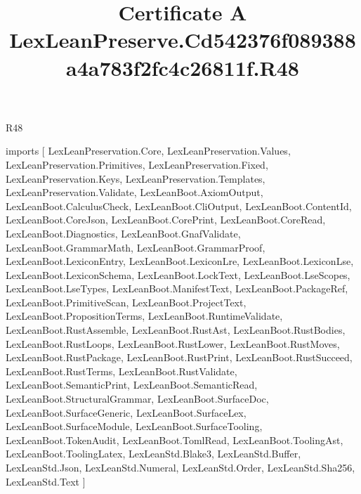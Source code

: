 \begin{lexlean}{R48}
\title{Certificate A LexLeanPreserve.Cd542376f089388a4a783f2fc4c26811f.R48}
\begin{coremodule}
imports [
  LexLeanPreservation.Core,
  LexLeanPreservation.Values,
  LexLeanPreservation.Primitives,
  LexLeanPreservation.Fixed,
  LexLeanPreservation.Keys,
  LexLeanPreservation.Templates,
  LexLeanPreservation.Validate,
  LexLeanBoot.AxiomOutput,
  LexLeanBoot.CalculusCheck,
  LexLeanBoot.CliOutput,
  LexLeanBoot.ContentId,
  LexLeanBoot.CoreJson,
  LexLeanBoot.CorePrint,
  LexLeanBoot.CoreRead,
  LexLeanBoot.Diagnostics,
  LexLeanBoot.GnafValidate,
  LexLeanBoot.GrammarMath,
  LexLeanBoot.GrammarProof,
  LexLeanBoot.LexiconEntry,
  LexLeanBoot.LexiconLre,
  LexLeanBoot.LexiconLse,
  LexLeanBoot.LexiconSchema,
  LexLeanBoot.LockText,
  LexLeanBoot.LseScopes,
  LexLeanBoot.LseTypes,
  LexLeanBoot.ManifestText,
  LexLeanBoot.PackageRef,
  LexLeanBoot.PrimitiveScan,
  LexLeanBoot.ProjectText,
  LexLeanBoot.PropositionTerms,
  LexLeanBoot.RuntimeValidate,
  LexLeanBoot.RustAssemble,
  LexLeanBoot.RustAst,
  LexLeanBoot.RustBodies,
  LexLeanBoot.RustLoops,
  LexLeanBoot.RustLower,
  LexLeanBoot.RustMoves,
  LexLeanBoot.RustPackage,
  LexLeanBoot.RustPrint,
  LexLeanBoot.RustSucceed,
  LexLeanBoot.RustTerms,
  LexLeanBoot.RustValidate,
  LexLeanBoot.SemanticPrint,
  LexLeanBoot.SemanticRead,
  LexLeanBoot.StructuralGrammar,
  LexLeanBoot.SurfaceDoc,
  LexLeanBoot.SurfaceGeneric,
  LexLeanBoot.SurfaceLex,
  LexLeanBoot.SurfaceModule,
  LexLeanBoot.SurfaceTooling,
  LexLeanBoot.TokenAudit,
  LexLeanBoot.TomlRead,
  LexLeanBoot.ToolingAst,
  LexLeanBoot.ToolingLatex,
  LexLeanStd.Blake3,
  LexLeanStd.Buffer,
  LexLeanStd.Json,
  LexLeanStd.Numeral,
  LexLeanStd.Order,
  LexLeanStd.Sha256,
  LexLeanStd.Text
]


\end{coremodule}
\end{lexlean}
